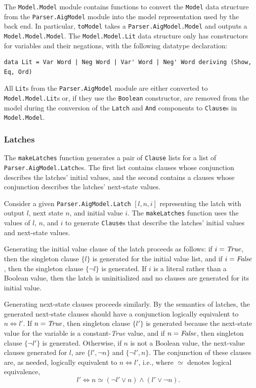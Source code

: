 \documentclass[12pt,a4paper,twoside,openright]{report}
\begin{document}
{{The \verb,Model.Model, module contains functions to convert the \verb,Model, data
structure from the \verb,Parser.AigModel, module into the model representation
used by the back end. In particular, \verb,toModel, takes a \verb,Parser.AigModel.Model,
and outputs a \verb,Model.Model.Model,. The \verb,Model.Model.Lit,
data structure only has constructors for variables and their negations,
with the following datatype declaration:
\begin{lstlisting}
data Lit = Var Word | Neg Word | Var' Word | Neg' Word deriving (Show, Eq, Ord)
\end{lstlisting}
All \verb,Lit,s from
the \verb,Parser.AigModel, module are either converted to \verb,Model.Model.Lit,s or, if
they use the \verb,Boolean, constructor, are removed from the model during the conversion of
the \verb,Latch, and \verb,And, components to \verb,Clause,s in \verb,Model.Model,.

\subsubsection{Latches}
The \verb,makeLatches, function generates a pair of \verb,Clause, lists
for a list of \verb,Parser.AigModel.Latch,es. The first list contains
clauses whose conjunction describes the latches' initial values,
and the second contains a clauses whose conjunction describes the
latches' next-state values.

Consider a given \verb,Parser.AigModel.Latch, $[l, n, i]$ representing the latch with
output $l$, next state $n$, %
and initial value $i$.
The \verb,makeLatches, function uses the
values of $l$, $n$, and $i$ to generate \verb,Clause,s that describe the latches' initial values and
next-state values.

Generating the initial value clause of the latch proceeds as follows: if $i = {\it True}$,
then the singleton clause $\{l\}$ is generated for the initial value list, and if $i = {\it False}$,
then the singleton clause $\{\neg l\}$ is generated.
If $i$ is a literal rather than a Boolean value, then the latch is
uninitialized and no clauses are generated for its initial value.

Generating next-state clauses proceeds similarly.
By the semantics of latches, the generated next-state clauses should have
a conjunction logically equivalent to $n \Leftrightarrow l'$.
If $n = {\it True}$, then singleton clause
$\{l'\}$ is generated because the next-state value for the variable is a constant-{\it True} value,
and if $n = {\it False}$, then singleton clause $\{\neg l'\}$ is generated.
Otherwise, if $n$ is not a Boolean value,
the next-value clauses generated for $l$, are $\{l', \neg n\}$
and $\{\neg l', n\}$. The conjunction of these clauses are, as needed, logically equivalent
to $n \Leftrightarrow l'$, i.e., where $\simeq$ denotes logical equivalence,
$$l' \Leftrightarrow n \simeq (\neg l' \vee n) \wedge (l' \vee \neg n).$$

}}
\end{document}
